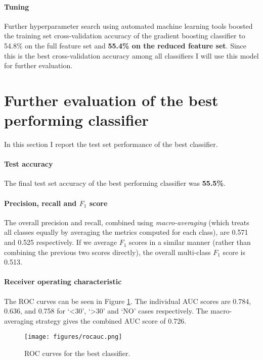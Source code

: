 \documentclass[10pt, twocolumn]{article}
\begin{document}
\paragraph{Tuning}
Further hyperparameter search using automated machine learning tools \cite{OlsonGECCO2016} boosted the training set cross-validation accuracy of the gradient boosting classifier to 54.8\% on the full feature set and \textbf{55.4\% on the reduced feature set}. Since this is the best cross-validation accuracy among all classifiers I will use this model for further evaluation.

\section{Further evaluation of the best performing classifier}
In this section I report the test set performance of the best classifier.

\paragraph{Test accuracy} The final test set accuracy of the best performing classifier was \textbf{55.5\%}. 



\paragraph{Precision, recall and $F_1$ score} The overall precision and recall, combined using \textit{macro-averaging} (which treats all classes equally by averaging the metrics computed for each class), are 0.571 and 0.525 respectively. If we average $F_1$ scores in a similar manner (rather than combining the previous two scores directly), the overall multi-class $F_1$ score is 0.513.

\paragraph{Receiver operating characteristic} The ROC curves can be seen in Figure \ref{rocauc}. The individual AUC scores are 0.784, 0.636, and 0.758 for ‘<30’, `>30' and `NO' cases respectively. The macro-averaging strategy gives the combined AUC score of 0.726.

\begin{figure}[htb!]
	\centering
	\texttt{[image: figures/rocauc.png]}
	\caption{ROC curves for the best classifier.}\label{rocauc}
\end{figure}
\end{document}
